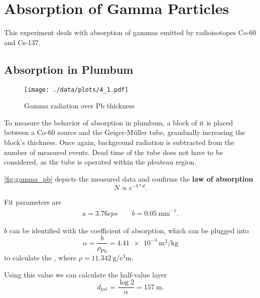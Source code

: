 \chapter{Absorption of Gamma Particles}
This experiment deals with absorption of gammas emitted by radioisotopes Co-60 and Cs-137.

\section{Absorption in Plumbum}
\begin{figure}[ht!]
	\centering
	\texttt{[image: ./data/plots/4\_1.pdf]}
	\caption[Gamma radiation over Pb thickness]{Gamma radiation over Pb thickness}
	\label{fig:gamma_pb}
\end{figure}
To measure the behavior of absorption in plumbum, a block of it is placed between a Co-60 source and the Geiger-Müller tube, graudually increasing the block's thickness.
Once again, background radiation is subtracted from the number of measured events.
Dead time of the tube does not have to be considered, as the tube is operated within the pleateau region.

\autoref{fig:gamma_pb} depicts the measured data and confirms the \textbf{law of absorption}
\begin{equation*}
	N\propto e^{-b*d}.
\end{equation*}

Fit parameters are
\begin{gather*}
	a=\num{3.76}cps\qquad b=\SI{0.05}{\milli\meter}^{-1}.
\end{gather*}

$b$ can be identified with the coefficient of absorption, which can be plugged into
\begin{equation*}
	\alpha=\frac{b}{\rho_\text{Pb}}=\SI{4.41e-3}{\meter\squared\per\kilogram}
\end{equation*}
to calculate the , where $\rho=\SI{11.342}{\gram\per\cubic\centi\meter}$.

Using this value we can calculate the half-value layer
\begin{equation*}
	d_\text{hvl}=\frac{\log{2}}{\alpha}=\SI{157}{\meter}.
\end{equation*}

